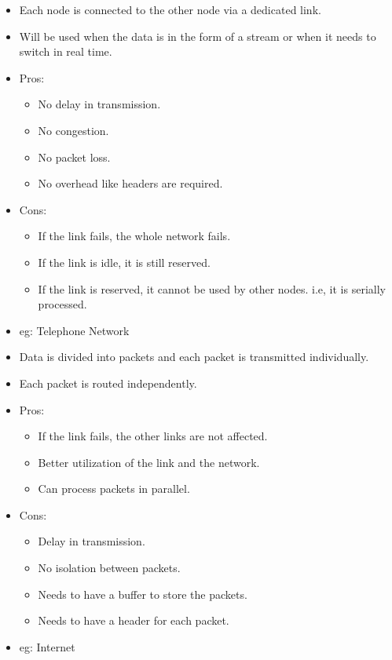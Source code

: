 \documentclass[a4paper, twoside]{report}
\begin{document}
\begin{itemize}
    \item Each node is connected to the other node via a dedicated link.
    \item Will be used when the data is in the form of a stream or when it needs to switch in real time.
    \item Pros: \begin{itemize}
        \item No delay in transmission.
        \item No congestion.
        \item No packet loss.
        \item No overhead like headers are required.
    \end{itemize}
    \item Cons: \begin{itemize}
        \item If the link fails, the whole network fails.
        \item If the link is idle, it is still reserved.
        \item If the link is reserved, it cannot be used by other nodes. i.e, it is serially processed.
    \end{itemize}
    \item eg: Telephone Network
\end{itemize}

\begin{itemize}
    \item Data is divided into packets and each packet is transmitted individually.
    \item Each packet is routed independently.
    \item Pros: \begin{itemize}
        \item If the link fails, the other links are not affected.
        \item Better utilization of the link and the network.
        \item Can process packets in parallel.
    \end{itemize}
    \item Cons: \begin{itemize}
        \item Delay in transmission.
        \item No isolation between packets.
        \item Needs to have a buffer to store the packets.
        \item Needs to have a header for each packet.
    \end{itemize}
    \item eg: Internet
\end{itemize}
\end{document}
